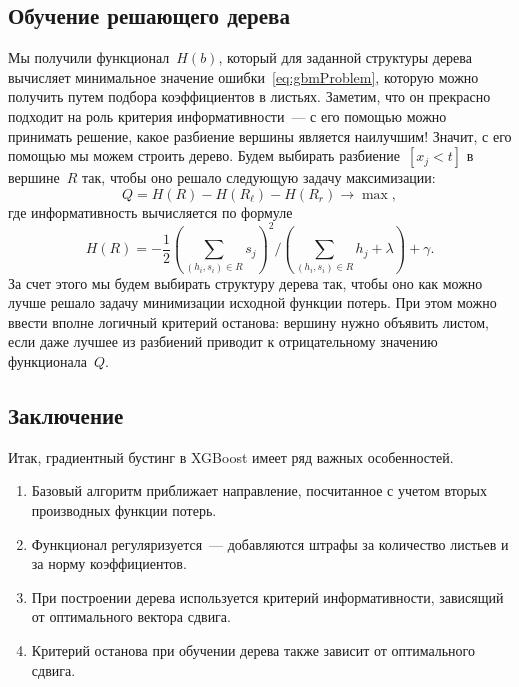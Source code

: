 \documentclass[12pt,fleqn]{article}
\begin{document}
\subsection{Обучение решающего дерева}
Мы получили функционал~$H(b)$, который для заданной структуры дерева
вычисляет минимальное значение ошибки~\eqref{eq:gbmProblem}, которую можно получить путем подбора коэффициентов в листьях.
Заметим, что он прекрасно подходит на роль критерия информативности~---
с его помощью можно принимать решение, какое разбиение вершины является наилучшим!
Значит, с его помощью мы можем строить дерево.
Будем выбирать разбиение~$[x_j < t]$ в вершине~$R$ так, чтобы оно решало следующую задачу максимизации:
\[
    Q = H(R) - H(R_\ell) - H(R_r) \to \max,
\]
где информативность вычисляется по формуле
\[
    H(R)
    =
    -
    \frac12
    \left(
        \sum_{(h_i, s_i) \in R} s_j
    \right)^2
    \Bigg/
    \left(
        \sum_{(h_i, s_i) \in R} h_j
        +
        \lambda
    \right)
    +
    \gamma.
\]
За счет этого мы будем выбирать структуру дерева так, чтобы оно как можно лучше
решало задачу минимизации исходной функции потерь.
При этом можно ввести вполне логичный критерий останова: вершину нужно объявить листом,
если даже лучшее из разбиений приводит к отрицательному значению функционала~$Q$.

\subsection{Заключение}
Итак, градиентный бустинг в XGBoost имеет ряд важных особенностей.
\begin{enumerate}
    \item Базовый алгоритм приближает направление, посчитанное с учетом вторых производных функции потерь.
    \item Функционал регуляризуется~--- добавляются штрафы за количество листьев и за норму коэффициентов.
    \item При построении дерева используется критерий информативности, зависящий от оптимального
        вектора сдвига.
    \item Критерий останова при обучении дерева также зависит от оптимального сдвига.
\end{enumerate}
\end{document}
